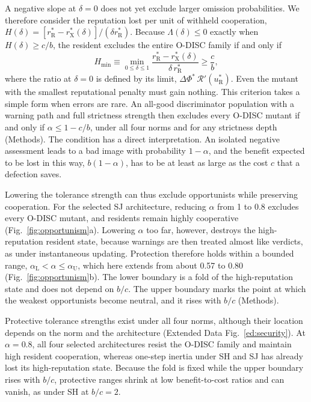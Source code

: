 \documentclass[10pt]{wlscirep}
\newcommand{\Rmap}{\mathscr{R}}            %
\newcommand{\rR}{r_{\mathrm{R}}^{*}}
\newcommand{\uR}{u_{\mathrm{R}}^{*}}
\newcommand{\rX}{r_{\mathrm{X}}^{*}}
\newcommand{\dPhi}{\Delta\Phi^{*}}
\newcommand{\Hmin}{H_{\min}}
\theoremstyle{plain}
\theoremstyle{remark}
\begin{document}
A negative slope at $\delta=0$ does not yet exclude larger omission probabilities. We therefore consider the reputation lost per unit of withheld cooperation, $H(\delta)=[\rR-\rX(\delta)]/(\delta\rR)$. Because $\Lambda(\delta)\leq0$ exactly when $H(\delta)\geq c/b$, the resident excludes the entire O-DISC family if and only if
\begin{equation}
\Hmin\equiv\min_{0\leq\delta\leq1}\frac{\rR-\rX(\delta)}{\delta\,\rR}\geq\frac{c}{b},
\label{eq:security}
\end{equation}
where the ratio at $\delta=0$ is defined by its limit, $\dPhi\,\Rmap'(\uR)$. Even the mutant with the smallest reputational penalty must gain nothing. This criterion takes a simple form when errors are rare. An all-good discriminator population with a warning path and full strictness strength then excludes every O-DISC mutant if and only if $\alpha\leq1-c/b$, under all four norms and for any strictness depth (Methods). The condition has a direct interpretation. An isolated negative assessment leads to a bad image with probability $1-\alpha$, and the benefit expected to be lost in this way, $b(1-\alpha)$, has to be at least as large as the cost $c$ that a defection saves.

Lowering the tolerance strength can thus exclude opportunists while preserving cooperation. For the selected SJ architecture, reducing $\alpha$ from 1 to 0.8 excludes every O-DISC mutant, and residents remain highly cooperative (Fig.~\ref{fig:opportunism}a). Lowering $\alpha$ too far, however, destroys the high-reputation resident state, because warnings are then treated almost like verdicts, as under instantaneous updating. Protection therefore holds within a bounded range, $\alpha_{\mathrm L}<\alpha\leq\alpha_{\mathrm U}$, which here extends from about 0.57 to 0.80 (Fig.~\ref{fig:opportunism}b). The lower boundary is a fold of the high-reputation state and does not depend on $b/c$. The upper boundary marks the point at which the weakest opportunists become neutral, and it rises with $b/c$ (Methods).

Protective tolerance strengths exist under all four norms, although their location depends on the norm and the architecture (Extended Data Fig.~\ref{ed:security}). At $\alpha=0.8$, all four selected architectures resist the O-DISC family and maintain high resident cooperation, whereas one-step inertia under SH and SJ has already lost its high-reputation state. Because the fold is fixed while the upper boundary rises with $b/c$, protective ranges shrink at low benefit-to-cost ratios and can vanish, as under SH at $b/c=2$.
\end{document}
